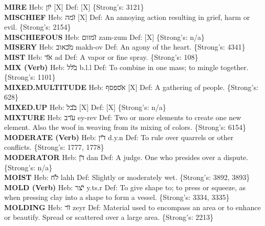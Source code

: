 {\textbf{MIRE} Heb: {\large\H יון} {[}X{]} Def: {[}X{]} \{Strong's: 3121\}\hfill{}\\

\textbf{MISCHIEF} Heb: {\large\H זמה} {[}X{]} Def: An annoying action resulting in grief, harm or evil. \{Strong's: 2154\}\hfill{}\\

\textbf{MISCHIEFOUS} Heb: {\large\H זמזום} zam-zum Def: {[}X{]} \{Strong's: n/a\}\hfill{}\\

\textbf{MISERY} Heb: {\large\H מכאוב} makh-ov Def: An agony of the heart. \{Strong's: 4341\}\hfill{}\\

\textbf{MIST} Heb: {\large\H אד} ad Def: A vapor or fine spray. \{Strong's: 108\}\hfill{}\\

\textbf{MIX (Verb)} Heb: {\large\H בלל} b.l.l Def: To combine in one mass; to mingle together. \{Strong's: 1101\}\hfill{}\\

\textbf{MIXED.MULTITUDE} Heb: {\large\H אספסף} {[}X{]} Def: A gathering of people. \{Strong's: 628\}\hfill{}\\

\textbf{MIXED.UP} Heb: {\large\H בבל} {[}X{]} Def: {[}X{]} \{Strong's: n/a\}\hfill{}\\

\textbf{MIXTURE} Heb: {\large\H ערב} ey-rev Def: Two or more elements to create one new element. Also the woof in weaving from its mixing of colors. \{Strong's: 6154\}\hfill{}\\

\textbf{MODERATE (Verb)} Heb: {\large\H דין} d.y.n Def: To rule over quarrels or other conflicts. \{Strong's: 1777, 1778\}\hfill{}\\

\textbf{MODERATOR} Heb: {\large\H דן} dan Def: A judge. One who presides over a dispute. \{Strong's: n/a\}\hfill{}\\

\textbf{MOIST} Heb: {\large\H לח} lahh Def: Slightly or moderately wet. \{Strong's: 3892, 3893\}\hfill{}\\

\textbf{MOLD (Verb)} Heb: {\large\H יצר} y.ts.r Def: To give shape to; to press or squeeze, as when pressing clay into a shape to form a vessel. \{Strong's: 3334, 3335\}\hfill{}\\

\textbf{MOLDING} Heb: {\large\H זר} zeyr Def: Material used to encompass an area or to enhance or beautify. Spread or scattered over a large area. \{Strong's: 2213\}\hfill{}\\

}
